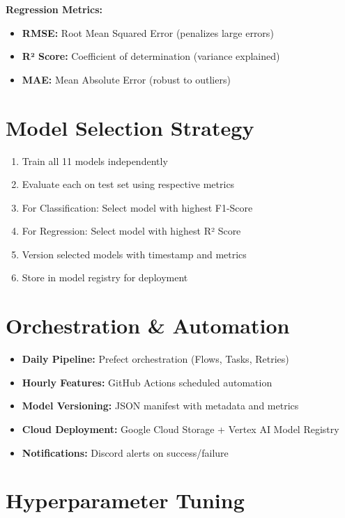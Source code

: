 \textbf{Regression Metrics:}
\begin{itemize}
    \item \textbf{RMSE:} Root Mean Squared Error (penalizes large errors)
    \item \textbf{R² Score:} Coefficient of determination (variance explained)
    \item \textbf{MAE:} Mean Absolute Error (robust to outliers)
\end{itemize}

\section{Model Selection Strategy}

\begin{enumerate}
    \item Train all 11 models independently
    \item Evaluate each on test set using respective metrics
    \item For Classification: Select model with highest F1-Score
    \item For Regression: Select model with highest R² Score
    \item Version selected models with timestamp and metrics
    \item Store in model registry for deployment
\end{enumerate}

\section{Orchestration \& Automation}

\begin{itemize}
    \item \textbf{Daily Pipeline:} Prefect orchestration (Flows, Tasks, Retries)
    \item \textbf{Hourly Features:} GitHub Actions scheduled automation
    \item \textbf{Model Versioning:} JSON manifest with metadata and metrics
    \item \textbf{Cloud Deployment:} Google Cloud Storage + Vertex AI Model Registry
    \item \textbf{Notifications:} Discord alerts on success/failure
\end{itemize}

\section{Hyperparameter Tuning}

